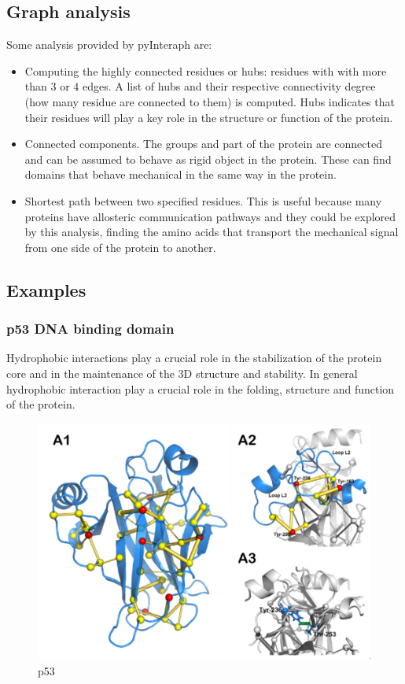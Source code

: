 	\subsection{Graph analysis}
	Some analysis provided by pyInteraph are:

	\begin{itemize}
		\item Computing the highly connected residues or hubs: residues with with more than $3$ or $4$ edges.
			A list of hubs and their respective connectivity degree (how many residue are connected to them) is computed.
			Hubs indicates that their residues will play a key role in the structure or function of the protein.
		\item Connected components.
			The groups and part of the protein are connected and can be assumed to behave as rigid object in the protein.
			These can find domains that behave mechanical in the same way in the protein.
		\item Shortest path between two specified residues.
			This is useful because many proteins have allosteric communication pathways and they could be explored by this analysis, finding the amino acids that transport the mechanical signal from one side of the protein to another.
	\end{itemize}

	\subsection{Examples}

		\subsubsection{p53 DNA binding domain}
		Hydrophobic interactions play a crucial role in the stabilization of the protein core and in the maintenance of the 3D structure and stability.
		In general hydrophobic interaction play a crucial role in the folding, structure and function of the protein.

		\begin{figure}[H]
			\includegraphics[width=\textwidth]{p53}
			\caption{p53}
			\label{fig:p53}
		\end{figure}

